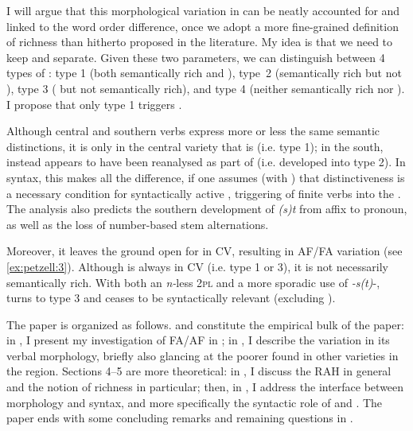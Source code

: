\documentclass[output=paper,colorlinks,citecolor=brown,draft,draftmode]{langscibook}
\begin{document}
I will argue that this morphological variation in  can be neatly accounted for and linked to the word order difference, once we adopt a more fine-grained definition of  richness than hitherto proposed in the literature. My idea is that we need to keep  and  separate. Given these two parameters, we can distinguish between 4 types of : type 1 (both semantically rich and ), type~2 (semantically rich but not ), type 3 ( but not semantically rich), and type 4 (neither semantically rich nor ). I propose that only type 1  triggers .



Although central and southern  verbs express more or less the same semantic distinctions, it is only in the central variety that  is  (i.e. type 1); in the south,  instead appears to have been reanalysed as part of  (i.e. developed into type 2). In syntax, this makes all the difference, if one assumes (with \citealt{BobaljikThrainsson1998}) that distinctiveness is a necessary condition for syntactically active , triggering  of finite verbs into the . The analysis also predicts the southern development of \textit{(s)t} from affix to pronoun, as well as the loss of number-based stem alternations. 



Moreover, it leaves the ground open for  in CV, resulting in AF/FA variation (see \ref{ex:petzell:3}). Although  is always  in CV (i.e. type 1 or 3), it is not necessarily semantically rich. With both an \textit{n-}less 2\textsc{pl} and a more sporadic use of \textit{-s(t)}-,  turns to type 3 and ceases to be syntactically relevant (excluding ).



The paper is organized as follows.  and  constitute the empirical bulk of the paper: in , I present my investigation of FA/AF in ; in , I describe the variation in its verbal morphology, briefly also glancing at the poorer  found in other varieties in the region. Sections 4–5 are more theoretical: in , I discuss the RAH in general and the notion of richness in particular; then, in , I address the interface between morphology and syntax, and more specifically the syntactic role of  and  . The paper ends with some concluding remarks and remaining questions in .
\end{document}
